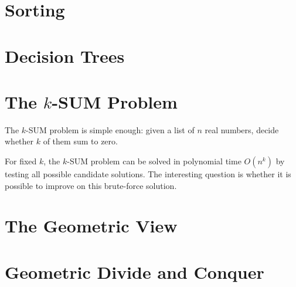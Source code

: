 \chapter{Sorting}

\chapter{Decision Trees}

\chapter{The \(k\)-SUM Problem}

The \(k\)-SUM problem is simple enough: given a list of \(n\) real numbers,
decide whether \(k\) of them sum to zero.



For fixed \(k\), the \(k\)-SUM problem can be solved in polynomial time
\(O(n^k)\) by testing all possible candidate solutions.
The interesting question is whether it is possible to improve on
this brute-force solution.

\chapter{The Geometric View}

\chapter{Geometric Divide and Conquer}
